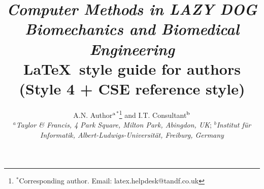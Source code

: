\documentclass{gCMB2e}
\begin{document}


\title{{\itshape Computer Methods in LAZY DOG Biomechanics and Biomedical Engineering}\\ \LaTeX\ style guide for authors (Style 4 + CSE reference style)}

\author{A.N. Author$^{\rm a}$$^{\ast}$\thanks{$^\ast$Corresponding author. Email: latex.helpdesk@tandf.co.uk
\vspace{6pt}} and I.T. Consultant$^{\rm b}$\\\vspace{6pt} $^{a}${\em{Taylor \& Francis, 4 Park Square, Milton Park, Abingdon, UK}};
$^{b}${\em{Institut f\"{u}r Informatik, Albert-Ludwigs-Universit\"{a}t, Freiburg,
Germany}}\\ }

\maketitle
\end{document}

